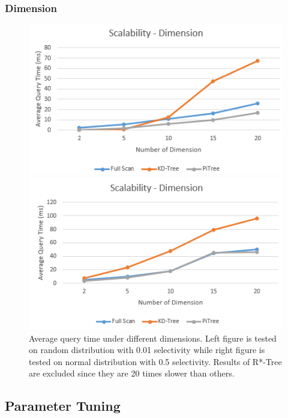 \documentclass[sigconf,10pt]{acmart}
\begin{document}
\subsubsection{Dimension}

\begin{figure}[ht] 
  \label{scalability-dimension} 
  \begin{minipage}[b]{0.45\linewidth}
    \centering
    \includegraphics[width=.8\linewidth]{../figures/scalability/dimension-random} 
    \vspace{4ex}
  \end{minipage}%
  \begin{minipage}[b]{0.45\linewidth}
    \centering
    \includegraphics[width=.8\linewidth]{../figures/scalability/dimension-normal} 
    \vspace{4ex}
  \end{minipage}%
  \caption{Average query time under different dimensions. Left figure is tested
  on random distribution with 0.01 selectivity while right figure is tested on normal distribution
  with 0.5 selectivity.
  Results of R*-Tree are excluded since they are 20 times slower than others.}
\end{figure}

\subsection{Parameter Tuning}
\end{document}
